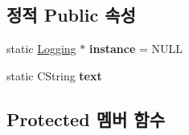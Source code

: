 \subsection*{정적 Public 속성}
\begin{DoxyCompactItemize}
\item 
\mbox{\label{class_logging_abbc7b283056098e51d9791175abbdc23}} 
static \mbox{\hyperlink{class_logging}{Logging}} $\ast$ {\bfseries instance} = N\+U\+LL
\item 
\mbox{\label{class_logging_a4a9482d0ffecc6b04232867690fd7b21}} 
static C\+String {\bfseries text}
\end{DoxyCompactItemize}
\subsection*{Protected 멤버 함수}
